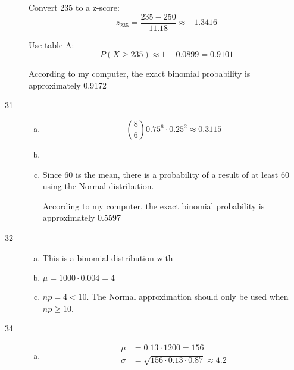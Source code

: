 \documentclass[letterpaper]{exam}
\begin{document}
\begin{description}
        Convert 235 to a z-score:
        \[
          z_{235} = \frac{235 - 250}{11.18} \approx -1.3416
        \]

        Use table A:
        \[
          P(X \geq 235) \approx 1 - 0.0899 = \boxed{ 0.9101 }
        \]

        According to my computer, the exact binomial probability is
        approximately 0.9172

      \item[31]
        \begin{enumerate}[(a)]
          \item 
            \[
              \binom{8}{6} 0.75^6 \cdot 0.25^2 \approx \boxed{ 0.3115 } 
            \]

          \item {}

          \item Since 60 is the mean, there is a  probability of a
            result of at least 60 using the Normal distribution.

            According to my computer, the exact binomial probability is
            approximately 0.5597

        \end{enumerate}

      \item[32]
        \begin{enumerate}[(a)]
          \item This is a binomial distribution with 

          \item $\mu = 1000 \cdot 0.004 = \boxed{ 4 }$

          \item $np = 4 < 10$. The Normal approximation should only be used when
            $np \geq 10$.
        \end{enumerate}

      \item[34]
        \begin{enumerate}[(a)]
          \item
            \begin{align*}
              \mu    & = 0.13 \cdot 1200 = \boxed{ 156 } \\
              \sigma & = \sqrt{156 \cdot 0.13 \cdot 0.87} \approx \boxed{ 4.2 } \\
            \end{align*}


\end{enumerate}
\end{description}
\end{document}
